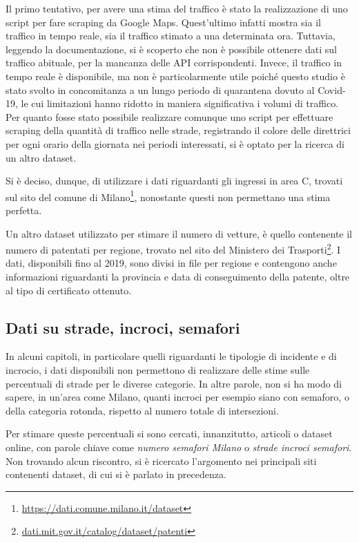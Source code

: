 \documentclass[a4paper,12pt]{report}
\newcommand{\quotestyle}[1]{\textit{#1}}
\begin{document}
Il primo tentativo, per avere una stima del traffico è stato la realizzazione di uno 
script per fare scraping da Google Maps. 
Quest'ultimo infatti mostra sia il traffico in tempo reale, sia 
il traffico stimato a una determinata ora. 
Tuttavia, leggendo la documentazione, si è scoperto che non è possibile ottenere 
dati sul traffico abituale, per la mancanza delle API corrispondenti. 
Invece, il traffico in tempo reale è disponibile, ma non è particolarmente utile 
poiché questo studio è stato svolto in concomitanza a un lungo periodo di quarantena 
dovuto al Covid-19, le cui limitazioni hanno ridotto in maniera significativa 
i volumi di traffico. 
Per quanto fosse stato possibile realizzare comunque uno script per effettuare 
scraping della quantità di traffico nelle strade, registrando il colore delle 
direttrici per ogni orario della giornata nei periodi interessati, si è 
optato per la ricerca di un altro dataset. 

Si è deciso, dunque, di utilizzare i dati riguardanti gli ingressi in area C, 
trovati sul sito del comune di Milano\footnote{\url{https://dati.comune.milano.it/dataset}}, 
nonostante questi non permettano una stima perfetta. 

Un altro dataset utilizzato per stimare il numero di vetture, è quello contenente 
il numero di patentati per regione, trovato nel sito del Ministero dei 
Trasporti\footnote{\url{dati.mit.gov.it/catalog/dataset/patenti}}. 
I dati, disponibili fino al 2019, sono divisi in file per regione e 
contengono anche informazioni riguardanti la provincia e data di conseguimento della 
patente, oltre al tipo di certificato ottenuto. 

\subsection{Dati su strade, incroci, semafori}

In alcuni capitoli, in particolare quelli riguardanti le tipologie di incidente e 
di incrocio, i dati disponibili non permettono di realizzare delle stime sulle 
percentuali di strade per le diverse categorie. 
In altre parole, non si ha modo di sapere, in un'area come Milano, quanti incroci 
per esempio siano con semaforo, o della categoria rotonda, 
rispetto al numero totale di intersezioni. 

Per stimare queste percentuali si sono cercati, innanzitutto, articoli o dataset online, con 
parole chiave come \quotestyle{numero semafori Milano} o \quotestyle{strade incroci semafori}. 
Non trovando alcun riscontro, si è ricercato l'argomento nei principali siti contenenti 
dataset, di cui si è parlato in precedenza. 
\end{document}
